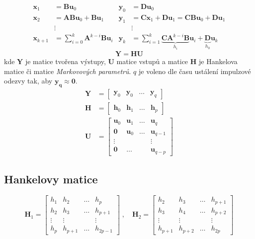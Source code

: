 \documentclass{article}
\begin{document}
	\begin{align}
		\bm{x}_1 &= \bm{B} \bm{u}_0
		&
		\bm{y}_0 &= \bm{D}\bm{u}_0
		\\
		\bm{x}_2 &= \bm{A}\bm{B} \bm{u}_0 + \bm{B} \bm{u}_1
		&
		\bm{y}_1 &= \bm{C}\bm{x}_1 + \bm{D} \bm{u}_1 = \bm{C}\bm{B}\bm{u}_0 + \bm{D} \bm{u}_1 
		\\
		&\vdots & &\vdots
		\\
		\bm{x}_{k+1} &= \sum_{i=0}^{k} \bm{A}^{k-i} \bm{B} \bm{u}_i
		&
		\bm{y}_{k} &= \sum_{i=1}^k \underbrace{\bm{C} \bm{A}^{k-i} \bm{B}}_{h_i} \bm{u}_i + \underbrace{\bm{D}}_{h_0} \bm{u}_k 
	\end{align}
	\begin{equation}
		\bm{Y} = \bm{H} \bm{U}
	\end{equation}
	kde $\bm{Y}$ je matice tvořena výstupy, $\bm{U}$ matice vstupů a matice $\bm{H}$ je Hankelova matice či matice \emph{Markovových parametrů}. $q$ je voleno dle času ustálení impulzové odezvy tak, aby $\bm{y_q}\approx \bm{0}$.
	\begin{align}
		\bm{Y}
		&=
		\begin{bmatrix}
			\bm{y}_0 & \bm{y}_0 & \dots & \bm{y}_q
		\end{bmatrix}
		\\
		\bm{H}
		&=
		\begin{bmatrix}
			\bm{h}_0 & \bm{h}_1 & \dots & \bm{h}_p
		\end{bmatrix}
		\\
		\bm{U}
		&=
		\begin{bmatrix}
			\bm{u}_0 & \bm{u}_1 & \dots & \bm{u}_q \\
			\bm{0} & \bm{u}_0 & \dots & \bm{u}_{q-1} \\
			\vdots & & & \vdots \\
			\bm{0} & \dots & & \bm{u}_{q-p} 
		\end{bmatrix}
	\end{align}

	\subsection{Hankelovy matice}
	\begin{equation}
		\bm{H}_1
		=
		\begin{bmatrix}
			h_1 & h_2 & \dots & h_p \\
			h_2 & h_3 & \dots & h_{p+1} \\
			\vdots & \vdots & & \vdots \\
			h_p & h_{p+1} & \dots & h_{2p-1}
		\end{bmatrix}
		\;,\quad 
		\bm{H}_2
		=
		\begin{bmatrix}
			h_2 & h_3 & \dots & h_{p+1} \\
			h_3 & h_4 & \dots & h_{p+2} \\
			\vdots & \vdots & & \vdots \\
			h_{p+1} & h_{p+2} & \dots & h_{2p}
		\end{bmatrix}
	\end{equation}
\end{document}
